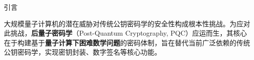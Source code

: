 \documentclass[12pt,a4paper]{article}
\numberwithin{equation}{section}
\begin{document}
\vspace{2em}

{\centering\heiti\fontsize{16pt}{24pt}\selectfont 引言\par}
\vspace{1em}







大规模量子计算机的潜在威胁对传统公钥密码学的安全性构成根本性挑战。为应对此挑战，\textbf{后量子密码学}（Post-Quantum Cryptography, PQC）应运而生，其核心在于构建基于\textbf{量子计算下困难数学问题}的密码体制，旨在替代当前广泛依赖的传统公钥密码学，实现密钥封装、数字签名等核心功能。
\end{document}
